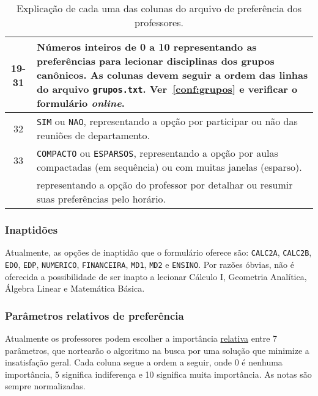 \documentclass[a4paper, 12pt]{report}
\begin{document}
\begin{table}[ht!]
\begin{tabularx}{0.95\textwidth}{c|X}
    19-31 & Números inteiros de 0 a 10 representando as preferências
    para lecionar disciplinas dos grupos canônicos. As colunas devem
    seguir a ordem das linhas do arquivo
    \verb+grupos.txt+. Ver~\ref{conf:grupos} e verificar o formulário
    \textit{online}. \\ \hline

    32 & \texttt{SIM} ou \texttt{NAO}, representando a opção por
    participar ou não das reuniões de departamento.\\ \hline

    33 & \texttt{COMPACTO} ou \texttt{ESPARSOS}, representando a opção
    por aulas compactadas (em sequência) ou com muitas janelas
    (esparso). \\ \hline

    & representando a opção do professor por detalhar ou resumir suas
    preferências pelo horário. \\ \hline
  \end{tabularx}
  \caption{\label{conf:pref:tab} Explicação de cada uma das colunas
    do arquivo de preferência dos professores.}
\end{table}

\subsubsection{Inaptidões}
\label{conf:pref:inap}

Atualmente, as opções de inaptidão que o formulário oferece são:
\texttt{CALC2A}, \texttt{CALC2B}, \texttt{EDO}, \texttt{EDP},
\texttt{NUMERICO}, \texttt{FINANCEIRA}, \texttt{MD1}, \texttt{MD2} e
\texttt{ENSINO}. Por razões óbvias, não é oferecida a possibilidade de
ser inapto a lecionar Cálculo I, Geometria Analítica, Álgebra Linear e
Matemática Básica.

\subsubsection{Parâmetros relativos de preferência}
\label{conf:pref:param}

Atualmente os professores podem escolher a importância
\underline{relativa} entre 7 parâmetros, que nortearão o algoritmo na
busca por uma solução que minimize a insatisfação geral. Cada coluna
segue a ordem a seguir, onde 0 é nenhuma importância, 5 significa
indiferença e 10 significa muita importância. As notas são sempre
normalizadas.
\end{document}
